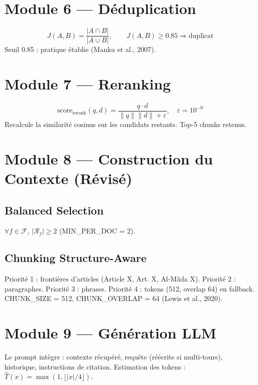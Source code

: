 \documentclass[11pt,a4paper]{article}
\begin{document}
\section{Module 6 --- Déduplication}

\begin{equation}
J(A, B) = \frac{|A \cap B|}{|A \cup B|}, \qquad J(A,B) \geq 0.85 \Longrightarrow \text{duplicat}
\end{equation}
Seuil 0.85 : pratique établie (Manku et al., 2007).

\section{Module 7 --- Reranking}

\begin{equation}
\text{score}_{\text{rerank}}(q, d) = \frac{q \cdot d}{\|q\| \|d\| + \varepsilon}, \quad \varepsilon = 10^{-9}
\end{equation}
Recalcule la similarité cosinus sur les candidats restants. Top-5 chunks retenus.

\section{Module 8 --- Construction du Contexte (Révisé)}

\subsection{Balanced Selection}

$\forall f \in \mathcal{F}$, $|\mathcal{R}_f| \geq 2$ (MIN\_PER\_DOC = 2).

\subsection{Chunking Structure-Aware}

Priorité 1 : frontières d'articles (Article X, Art. X, Al-Mâda X). Priorité 2 : paragraphes. Priorité 3 : phrases. Priorité 4 : tokens (512, overlap 64) en fallback. CHUNK\_SIZE = 512, CHUNK\_OVERLAP = 64 (Lewis et al., 2020).

\section{Module 9 --- Génération LLM}

Le prompt intègre : contexte récupéré, requête (réécrite si multi-tours), historique, instructions de citation. Estimation des tokens : $\widehat{T}(x) = \max(1, \lfloor |x|/4 \rfloor)$.
\end{document}
